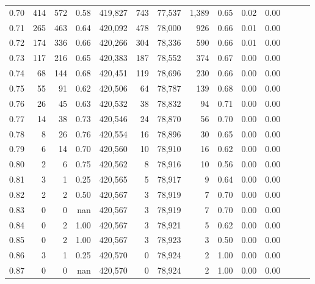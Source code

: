 \begin{tabular}{rrrrrrrrrrrrrr}
0.70 &     414 &    572 &  0.58 &  419,827 &      743 &  77,537 &   1,389 &  0.65 &  0.02 &      0.00 \\
0.71 &     265 &    463 &  0.64 &  420,092 &      478 &  78,000 &     926 &  0.66 &  0.01 &      0.00 \\
0.72 &     174 &    336 &  0.66 &  420,266 &      304 &  78,336 &     590 &  0.66 &  0.01 &      0.00 \\
0.73 &     117 &    216 &  0.65 &  420,383 &      187 &  78,552 &     374 &  0.67 &  0.00 &      0.00 \\
0.74 &      68 &    144 &  0.68 &  420,451 &      119 &  78,696 &     230 &  0.66 &  0.00 &      0.00 \\
0.75 &      55 &     91 &  0.62 &  420,506 &       64 &  78,787 &     139 &  0.68 &  0.00 &      0.00 \\
0.76 &      26 &     45 &  0.63 &  420,532 &       38 &  78,832 &      94 &  0.71 &  0.00 &      0.00 \\
0.77 &      14 &     38 &  0.73 &  420,546 &       24 &  78,870 &      56 &  0.70 &  0.00 &      0.00 \\
0.78 &       8 &     26 &  0.76 &  420,554 &       16 &  78,896 &      30 &  0.65 &  0.00 &      0.00 \\
0.79 &       6 &     14 &  0.70 &  420,560 &       10 &  78,910 &      16 &  0.62 &  0.00 &      0.00 \\
0.80 &       2 &      6 &  0.75 &  420,562 &        8 &  78,916 &      10 &  0.56 &  0.00 &      0.00 \\
0.81 &       3 &      1 &  0.25 &  420,565 &        5 &  78,917 &       9 &  0.64 &  0.00 &      0.00 \\
0.82 &       2 &      2 &  0.50 &  420,567 &        3 &  78,919 &       7 &  0.70 &  0.00 &      0.00 \\
0.83 &       0 &      0 &   nan &  420,567 &        3 &  78,919 &       7 &  0.70 &  0.00 &      0.00 \\
0.84 &       0 &      2 &  1.00 &  420,567 &        3 &  78,921 &       5 &  0.62 &  0.00 &      0.00 \\
0.85 &       0 &      2 &  1.00 &  420,567 &        3 &  78,923 &       3 &  0.50 &  0.00 &      0.00 \\
0.86 &       3 &      1 &  0.25 &  420,570 &        0 &  78,924 &       2 &  1.00 &  0.00 &      0.00 \\
0.87 &       0 &      0 &   nan &  420,570 &        0 &  78,924 &       2 &  1.00 &  0.00 &      0.00 \\

\end{tabular}

